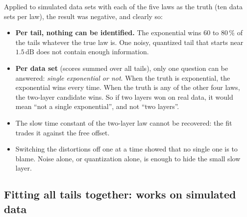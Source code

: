 \documentclass[11pt,a4paper]{article}
\newcommand{\dB}{\,\mathrm{dB}}
\begin{document}
Applied to simulated data sets with each of the five laws as the truth (ten data sets per law), the result was
negative, and clearly so:
\begin{itemize}
\item \textbf{Per tail, nothing can be identified.} The exponential wins 60 to 80\,\% of the tails whatever the true
law is. One noisy, quantized tail that starts near $1.5\dB$ does not contain enough information.
\item \textbf{Per data set} (scores summed over all tails), only one question can be answered: \emph{single
exponential or not}. When the truth is exponential, the exponential wins every time. When the truth is any of the
other four laws, the two-layer candidate wins. So if two layers won on real data, it would mean ``not a single
exponential'', and not ``two layers''.
\item The slow time constant of the two-layer law cannot be recovered: the fit trades it against the free offset.
\item Switching the distortions off one at a time showed that no single one is to blame. Noise alone, or quantization
alone, is enough to hide the small slow layer.
\end{itemize}

\subsection{Fitting all tails together: works on simulated data}
\label{sec:pooled}
\end{document}
